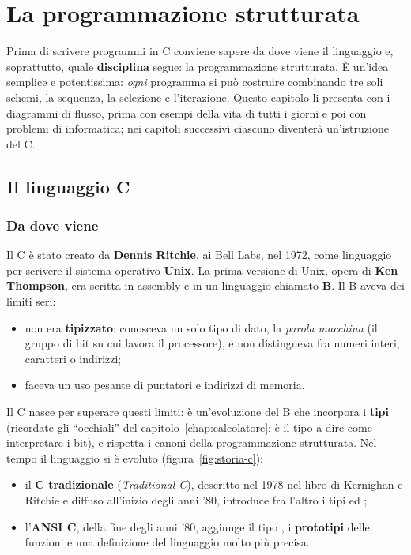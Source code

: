 \chapter{La programmazione strutturata}
\label{chap:strutturata}

Prima di scrivere programmi in C conviene sapere da dove viene il linguaggio
e, soprattutto, quale \textbf{disciplina} segue: la programmazione
strutturata. È un'idea semplice e potentissima: \textit{ogni} programma si
può costruire combinando tre soli schemi, la sequenza, la selezione e
l'iterazione. Questo capitolo li presenta con i diagrammi di flusso, prima
con esempi della vita di tutti i giorni e poi con problemi di informatica;
nei capitoli successivi ciascuno diventerà un'istruzione del C.

\section{Il linguaggio C}

\subsection{Da dove viene}

Il C è stato creato da \textbf{Dennis Ritchie}, ai Bell Labs, nel 1972,
come linguaggio per scrivere il sistema operativo \textbf{Unix}. La prima
versione di Unix, opera di \textbf{Ken Thompson}, era scritta in assembly e
in un linguaggio chiamato \textbf{B}. Il B aveva dei limiti seri:

\begin{itemize}
  \item non era \textbf{tipizzato}: conosceva un solo tipo di dato, la
        \textit{parola macchina} (il gruppo di bit su cui lavora il
        processore), e non distingueva fra numeri interi, caratteri o
        indirizzi;
  \item faceva un uso pesante di puntatori e indirizzi di memoria.
\end{itemize}

Il C nasce per superare questi limiti: è un'evoluzione del B che incorpora
i \textbf{tipi} (ricordate gli “occhiali” del
capitolo~\ref{chap:calcolatore}: è il tipo a dire come interpretare i
bit), e rispetta i canoni della programmazione strutturata. Nel tempo il
linguaggio si è evoluto (figura~\ref{fig:storia-c}):

\begin{itemize}
  \item il \textbf{C tradizionale} (\textit{Traditional C}), descritto nel
        1978 nel libro di Kernighan e Ritchie e diffuso all'inizio degli anni
        '80, introduce fra l'altro i tipi  ed ;
  \item l'\textbf{ANSI C}, della fine degli anni '80, aggiunge il tipo
        , i \textbf{prototipi} delle funzioni e una definizione
        del linguaggio molto più precisa.
\end{itemize}

